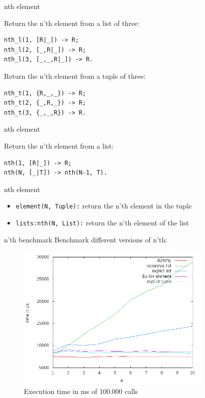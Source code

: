 \begin{frame}[fragile]{nth element}

Return the n'th element from a list of three:

\pause 
\begin{verbatim}
nth_l(1, [R|_]) -> R;
nth_l(2, [_,R|_]) -> R;
nth_l(3, [_,_,R|_]) -> R.
\end{verbatim}

\pause Return the n'th element from a tuple of three:
\pause

\begin{verbatim}
nth_t(1, {R,_,_}) -> R;
nth_t(2, {_,R,_}) -> R;
nth_t(3, {_,_,R}) -> R.
\end{verbatim}

\end{frame}

\begin{frame}[fragile]{nth element}

Return the n'th element from a list:

\pause 
\begin{verbatim}
nth(1, [R|_]) -> R;
nth(N, [_|T]) -> nth(N-1, T).
\end{verbatim}

\end{frame}


\begin{frame}{nth element}

\begin{itemize}
  \item {\tt element(N, Tuple):} return the n'th element in the tuple
  \item {\tt lists:nth(N, List):} return the n'th element of the list
\end{itemize}

\end{frame}

\begin{frame}{n'th benchmark}
Benchmark different versions of n'th:
 \begin{figure}
  \centering
  \includegraphics[height=200pt]{nth.png}
  \caption{Execution time in ms of 100.000 calls}
 \end{figure}

\end{frame}

